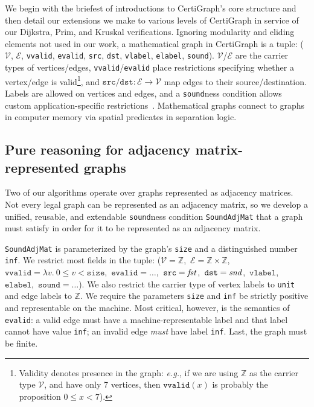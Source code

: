 We begin with the briefest of introductions to CertiGraph's core structure and then detail our extensions we make to various levels of
CertiGraph in service of our Dijkstra, Prim, and Kruskal verifications.
Ignoring modularity and eliding elements not used in our work,
a mathematical graph in CertiGraph is a tuple:
($\mathcal{V}$, $\mathcal{E}$, \texttt{vvalid}, \texttt{evalid},
\texttt{src}, \texttt{dst}, \texttt{vlabel}, \texttt{elabel},
\texttt{sound}). $\mathcal{V}$/$\mathcal{E}$ are the carrier
types of vertices/edges, \texttt{vvalid}/\texttt{evalid}
place restrictions specifying whether a vertex/edge is
valid\footnote{Validity denotes presence in the graph: \emph{e.g.}, if we are using $\mathbb{Z}$ as the carrier type $\mathcal{V}$, and have
only 7 vertices, then $\texttt{vvalid}(x)$ is probably the proposition $0 \le x < 7$).},
and $\texttt{src}/\texttt{dst} : \mathcal{E} \to \mathcal{V}$ map edges to their source/destination.
Labels are allowed on vertices and edges, and
a \texttt{sound}ness condition allows custom application-specific
restrictions~\cite{DBLP:journals/pacmpl/WangCMH19}.
Mathematical graphs connect to graphs in computer memory via spatial predicates in separation logic.

\subsection{Pure reasoning for adjacency matrix-represented graphs}
\label{sec:adjmatpure}

Two of our algorithms operate over graphs represented as adjacency matrices.
Not every legal graph can be represented as an adjacency matrix,
so we develop a unified, reusable, and extendable \texttt{sound}ness condition
\texttt{SoundAdjMat} that a graph must satisfy in order for it
to be represented as an adjacency matrix.

\texttt{SoundAdjMat} is parameterized by the graph's \texttt{size} and a distinguished number \texttt{inf}.
We restrict most fields in the tuple:
($\mathcal{V}=\mathbb{Z}$,\ $\mathcal{E}=\mathbb{Z} \times \mathbb{Z}$,\ $\texttt{vvalid}=\lambda v.~\mbox{$0 \le v < \texttt{size}$}$,\ $\texttt{evalid}=\ldots$,\ $\texttt{src}=\mathit{fst}$,\ $\texttt{dst}=\mathit{snd}$,\ $\texttt{vlabel}$,\ $\texttt{elabel}$,\ $\texttt{sound}=\ldots$).  We also restrict the carrier type of vertex labels to \texttt{unit} and edge labels to $\mathbb{Z}$.
We require the parameters \texttt{size} and \texttt{inf} be
strictly positive and representable on the machine.
Most critical, however, is the semantics of \texttt{evalid}:
a valid edge must have a machine-representable label and that label
cannot have value \texttt{inf}; an invalid edge \emph{must} have label \texttt{inf}.
Last, the graph must be finite.

